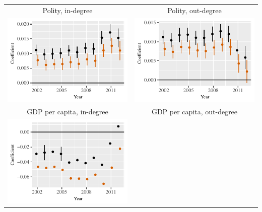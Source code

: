 \documentclass[reqno,onecolumn,letterpaper,12pt]{article}
\begin{document}
\begin{longtable}[!h]{c@{\hskip -.4cm}c}
Polity, in-degree &
Polity, out-degree\\
\includegraphics[height=.2\textheight, clip=true, trim=0cm .5cm 0cm .1cm]{draft_figures/rl_plots/Polity_in.pdf}   &
\includegraphics[height=.2\textheight, clip=true, trim=.5cm .5cm 0cm .1cm]{draft_figures/rl_plots/Polity_out.pdf}   \\
GDP per capita, in-degree &
GDP per capita,  out-degree\\
\includegraphics[height=.2\textheight, clip=true, trim=0cm .5cm 0cm .1cm]{draft_figures/rl_plots/GDPpc_in.pdf} &

\end{longtable}
\end{document}
